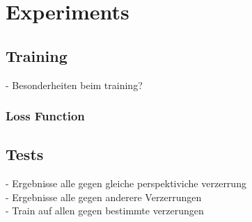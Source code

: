 \chapter{Experiments}
\label{sec:exp}


\section{Training}
\label{sec:exp:train}
- Besonderheiten beim training?

\subsection{Loss Function}	
\label{sec:exp:train:loss}

\section{Tests}
\label{sec:exp:test}
- Ergebnisse alle gegen gleiche perspektiviche verzerrung \\
- Ergebnisse alle gegen anderere Verzerrungen \\
- Train auf allen gegen bestimmte verzerungen 
	
